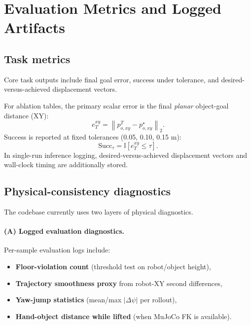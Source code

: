 \section{Evaluation Metrics and Logged Artifacts}

\subsection{Task metrics}

Core task outputs include final goal error, success under tolerance, and desired-versus-achieved displacement vectors.

For ablation tables, the primary scalar error is the final \emph{planar} object-goal distance (XY):
\begin{equation}
e_T^{xy} = \left\lVert p_{o,xy}^T - p_{o,xy}^{\star} \right\rVert_2.
\label{eq:goal_error_exp}
\end{equation}
Success is reported at fixed tolerances (0.05, 0.10, 0.15 m):
\begin{equation}
\mathrm{Succ}_{\tau} = \mathbb{I}[e_T^{xy} \le \tau].
\label{eq:success_metric_exp}
\end{equation}
In single-run inference logging, desired-versus-achieved displacement vectors and wall-clock timing are additionally stored.

\subsection{Physical-consistency diagnostics}

The codebase currently uses two layers of physical diagnostics.

\paragraph{(A) Logged evaluation diagnostics.}
Per-sample evaluation logs include:
\begin{itemize}
    \item \textbf{Floor-violation count} (threshold test on robot/object height),
    \item \textbf{Trajectory smoothness proxy} from robot-XY second differences,
    \item \textbf{Yaw-jump statistics} (mean/max $|\Delta\psi|$ per rollout),
    \item \textbf{Hand-object distance while lifted} (when MuJoCo FK is available).
\end{itemize}

